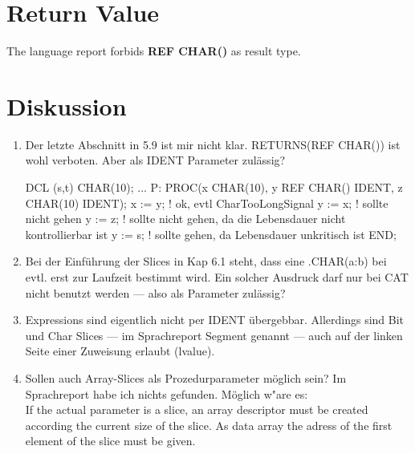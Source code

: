 \section{Return Value}
The language report forbids \textbf{REF CHAR()} as result type.

\section{Diskussion}
\begin{enumerate}
\item Der letzte Abschnitt in 5.9 ist mir nicht klar.
RETURNS(REF CHAR()) ist wohl verboten.
Aber als IDENT Parameter zul\"assig?

\begin{PEARLCode}
DCL (s,t) CHAR(10);
...
P: PROC(x CHAR(10), y REF CHAR() IDENT, z CHAR(10) IDENT);
   x := y; ! ok, evtl CharTooLongSignal
   y := x; ! sollte nicht gehen
   y := z; ! sollte nicht gehen, da die Lebensdauer nicht kontrollierbar ist
   y := s; ! sollte gehen, da Lebensdauer unkritisch ist
END;
\end{PEARLCode}

\item Bei der Einf\"uhrung der Slices in Kap 6.1 steht, dass eine .CHAR(a:b)
 bei evtl. 
erst zur Laufzeit bestimmt wird. Ein solcher Ausdruck darf nur 
bei CAT nicht benutzt werden --- also als Parameter zul\"assig?
\item Expressions sind eigentlich nicht per IDENT \"ubergebbar. Allerdings sind
Bit und Char Slices --- im Sprachreport Segment genannt --- auch auf der 
linken Seite einer Zuweisung erlaubt (lvalue).
\item Sollen auch Array-Slices als Prozedurparameter m\"oglich sein?
Im Sprachreport habe ich nichts gefunden. M\"oglich w"are es:\\ 
If the actual parameter is a slice, an array descriptor must be created
 according the  current size of the slice. As data array  the adress
of the first element of the slice must be given.

\end{enumerate}
